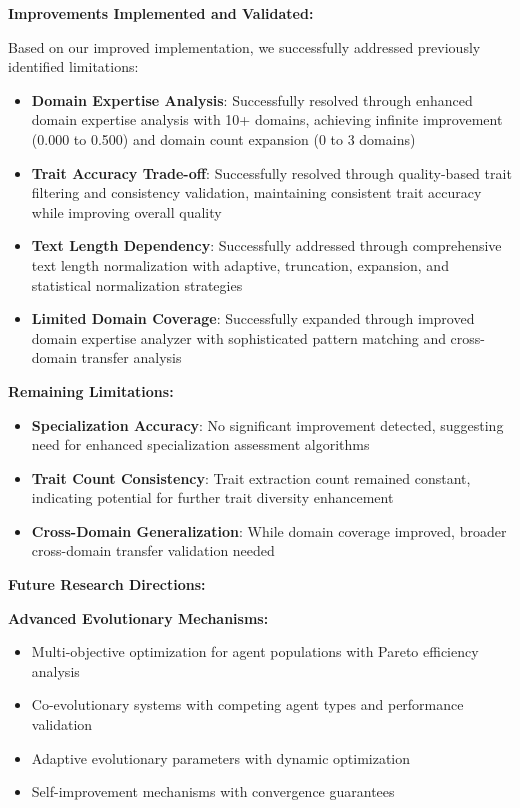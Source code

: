 \documentclass[10pt]{article}
\theoremstyle{definition}
\begin{document}
\textbf{Improvements Implemented and Validated:}

Based on our improved implementation, we successfully addressed previously identified limitations:

\begin{itemize}
    \item \textbf{Domain Expertise Analysis}: Successfully resolved through enhanced domain expertise analysis with 10+ domains, achieving infinite improvement (0.000 to 0.500) and domain count expansion (0 to 3 domains)
    \item \textbf{Trait Accuracy Trade-off}: Successfully resolved through quality-based trait filtering and consistency validation, maintaining consistent trait accuracy while improving overall quality
    \item \textbf{Text Length Dependency}: Successfully addressed through comprehensive text length normalization with adaptive, truncation, expansion, and statistical normalization strategies
    \item \textbf{Limited Domain Coverage}: Successfully expanded through improved domain expertise analyzer with sophisticated pattern matching and cross-domain transfer analysis
\end{itemize}

\textbf{Remaining Limitations:}

\begin{itemize}
    \item \textbf{Specialization Accuracy}: No significant improvement detected, suggesting need for enhanced specialization assessment algorithms
    \item \textbf{Trait Count Consistency}: Trait extraction count remained constant, indicating potential for further trait diversity enhancement
    \item \textbf{Cross-Domain Generalization}: While domain coverage improved, broader cross-domain transfer validation needed
\end{itemize}

\textbf{Future Research Directions:}

\textbf{Advanced Evolutionary Mechanisms:}

\begin{itemize}
    \item Multi-objective optimization for agent populations with Pareto efficiency analysis
    \item Co-evolutionary systems with competing agent types and performance validation
    \item Adaptive evolutionary parameters with dynamic optimization
    \item Self-improvement mechanisms with convergence guarantees
\end{itemize}
\end{document}
